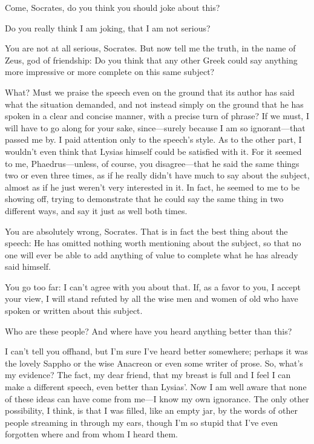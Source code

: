 \sayphaedrus Come, Socrates, do you think you should joke about this?

\saysocrates Do you really think I am joking, that I am not serious?

\sayphaedrus You are not at all serious, Socrates. But now tell me
the truth, in the name of Zeus, god of friendship: Do you think that any
other Greek could say anything more impressive or more complete on this
same subject?

\saysocrates What? Must we praise the speech even on the ground that its
author has said what the situation demanded, and not instead simply on
the ground that he has spoken in a clear and concise manner, with a
precise turn of phrase? If we must, I will have to go along for your
sake, since---surely because I am so ignorant---that
passed me by. I paid attention only to the speech’s style. As to the
other part, I wouldn’t even think that Lysias himself could be satisfied
with it. For it seemed to me, Phaedrus---unless, of course, you
disagree---that he said the same things two or even three times, as if
he really didn’t have much to say about the subject, almost as if he
just weren’t very interested in it. In fact, he seemed to me to be
showing off, trying to demonstrate that he could say the same thing in
two different ways, and say it just as well both times.

\sayphaedrus You are absolutely wrong, Socrates. That is in fact
the best thing about the speech: He has omitted nothing worth mentioning
about the subject, so that no one will ever be able to add anything of
value to complete what he has already said himself.

\saysocrates You go too far: I can’t agree with you about that. If, as a
favor to you, I accept your view, I will stand refuted by all the wise
men and women of old who have spoken or written about this subject.

\sayphaedrus Who are these people? And where have you heard anything 
better than this?

\saysocrates I can’t tell you offhand, but I’m sure I’ve heard better
somewhere; perhaps it was the lovely Sappho or the wise Anacreon or even
some writer of prose. So, what’s my evidence? The fact, my dear friend,
that my breast is full and I feel I can make a different speech, even
better than Lysias’. Now I am well aware that none of these ideas can
have come from me---I know my own ignorance. The only other possibility,
I think, is that I was filled, like an empty jar, by the words
of other people streaming in through my ears, though I’m so stupid that
I’ve even forgotten where and from whom I heard them.


